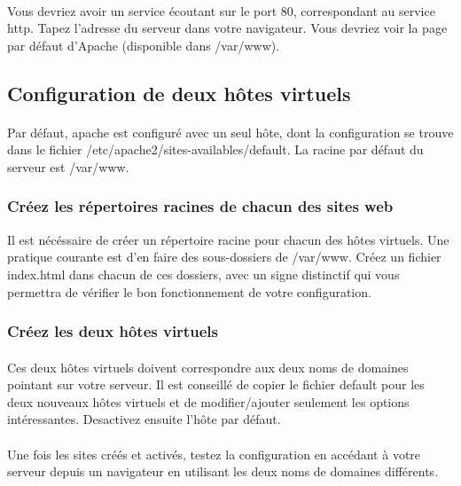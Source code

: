 \documentclass[12pt,a4paper]{article}
\begin{document}
\paragraph{}
Vous devriez avoir un service écoutant sur le port 80, correspondant au service http. Tapez l'adresse du serveur dans votre navigateur. Vous devriez voir la page par défaut d'Apache (disponible dans /var/www).

\subsection{Configuration de deux hôtes virtuels}
\paragraph{}
Par défaut, apache est configuré avec un seul hôte, dont la configuration se trouve dans le fichier /etc/apache2/sites-availables/default. La racine par défaut du serveur est /var/www.

\subsubsection{Créez les répertoires racines de chacun des sites web}
Il est nécéssaire de créer un répertoire racine pour chacun des hôtes virtuels. Une pratique courante est d'en faire des sous-dossiers de /var/www. Créez un fichier index.html dans chacun de ces dossiers, avec un signe distinctif qui vous permettra de vérifier le bon fonctionnement de votre configuration.

\subsubsection{Créez les deux hôtes virtuels}

\paragraph{}
Ces deux hôtes virtuels doivent correspondre aux deux noms de domaines pointant sur votre serveur. Il est conseillé de copier le fichier default pour les deux nouveaux hôtes virtuels et de modifier/ajouter seulement les options intéressantes. Desactivez ensuite l'hôte par défaut.

\paragraph{}
Une fois les sites créés et activés, testez la configuration en accédant à votre serveur depuis un navigateur en utilisant les deux noms de domaines différents.
\end{document}

